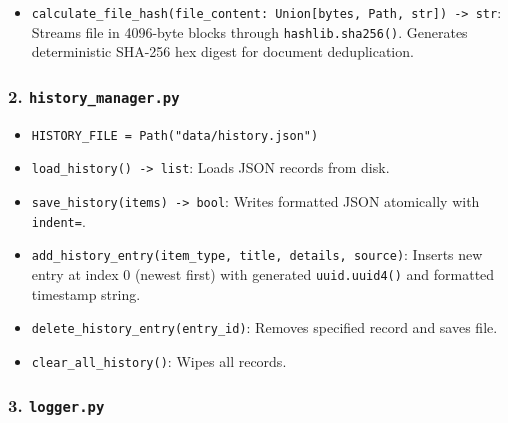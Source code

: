 \documentclass[
]{article}
\providecommand{\tightlist}{%
  \setlength{\itemsep}{0pt}\setlength{\parskip}{0pt}}
\begin{document}
\begin{itemize}
\tightlist
\item
  \texttt{calculate\_\allowbreak file\_\allowbreak hash(\allowbreak file\_\allowbreak content:\ \allowbreak Union{[}bytes,\allowbreak \ \allowbreak Path,\allowbreak \ \allowbreak str{]})\allowbreak \ \allowbreak -\textgreater{}\allowbreak \ \allowbreak str}:
  Streams file in 4096-byte blocks through \texttt{hashlib.\allowbreak sha256(\allowbreak )\allowbreak }.
  Generates deterministic SHA-256 hex digest for document deduplication.
\end{itemize}

\subsubsection{\texorpdfstring{2.
\texttt{history\_\allowbreak manager.\allowbreak py}}{2. history\_manager.py}}\label{history_manager.py}

\begin{itemize}
\tightlist
\item
  \texttt{HISTORY\_\allowbreak FILE\ \allowbreak =\allowbreak \ \allowbreak Path(\allowbreak "data/\allowbreak history.\allowbreak json")\allowbreak }
\item
  \texttt{load\_\allowbreak history(\allowbreak )\allowbreak \ \allowbreak -\textgreater{}\allowbreak \ \allowbreak list}: Loads JSON records
  from disk.
\item
  \texttt{save\_\allowbreak history(\allowbreak items)\allowbreak \ \allowbreak -\textgreater{}\allowbreak \ \allowbreak bool}: Writes formatted
  JSON atomically with \texttt{indent=}.
\item
  \texttt{add\_\allowbreak history\_\allowbreak entry(\allowbreak item\_\allowbreak type,\allowbreak \ \allowbreak title,\allowbreak \ \allowbreak details,\allowbreak \ \allowbreak source)\allowbreak }:
  Inserts new entry at index 0 (newest first) with generated
  \texttt{uuid.\allowbreak uuid4(\allowbreak )\allowbreak } and formatted timestamp string.
\item
  \texttt{delete\_\allowbreak history\_\allowbreak entry(\allowbreak entry\_\allowbreak id)\allowbreak }: Removes specified record
  and saves file.
\item
  \texttt{clear\_\allowbreak all\_\allowbreak history(\allowbreak )\allowbreak }: Wipes all records.
\end{itemize}

\subsubsection{\texorpdfstring{3.
\texttt{logger.\allowbreak py}}{3. logger.py}}\label{logger.py}
\end{document}

